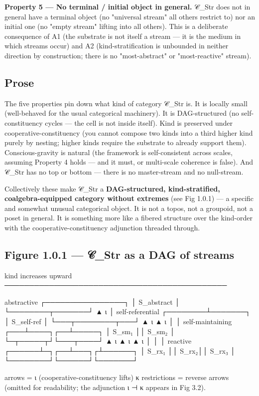 \documentclass[11pt, openany]{book}
\begin{document}
\textbf{Property 5 --- No terminal / initial object in general.} 𝒞\_\allowbreak{}Str does not in general have a terminal object (no "universal stream" all others restrict to) nor an initial one (no "empty stream" lifting into all others). This is a deliberate consequence of A1 (the substrate is not itself a stream --- it is the medium in which streams occur) and A2 (kind-stratification is unbounded in neither direction by construction; there is no "most-abstract" or "most-reactive" stream).

\subsection{Prose}

The five properties pin down what kind of category 𝒞\_\allowbreak{}Str is. It is locally small (well-behaved for the usual categorical machinery). It is DAG-structured (no self-constituency cycles --- the cell is not inside itself). Kind is preserved under cooperative-constituency (you cannot compose two kinds into a third higher kind purely by nesting; higher kinds require the substrate to already support them). Conscious-gravity is natural (the framework is self-consistent across scales, assuming Property 4 holds --- and it must, or multi-scale coherence is false). And 𝒞\_\allowbreak{}Str has no top or bottom --- there is no master-stream and no null-stream.

Collectively these make 𝒞\_\allowbreak{}Str a \textbf{DAG-structured, kind-stratified, coalgebra-equipped category without extremes} (see Fig 1.0.1) --- a specific and somewhat unusual categorical object. It is not a topos, not a groupoid, not a poset in general. It is something more like a fibered structure over the kind-order with the cooperative-constituency adjunction threaded through.

\subsection{Figure 1.0.1 --- 𝒞\_\allowbreak{}Str as a DAG of streams}

\begin{Code}
kind increases upward
─────────────────────────────────────────────

  abstractive     ┌────────────────┐
                  │   S_abstract   │
                  └────────┬───────┘
                           ▲ ι
                           │
  self-referential ┌────────┴───────┐
                   │   S_self-ref   │
                   └───┬────────┬───┘
                       ▲ ι      ▲ ι
                       │        │
  self-maintaining ┌───┴────┐┌──┴─────┐
                   │ S_sm₁  ││ S_sm₂  │
                   └─┬─────┬┘└───┬────┘
                     ▲ ι   ▲ ι   ▲ ι
                     │     │     │
  reactive    ┌──────┴─┐┌──┴───┐┌┴──────┐
              │ S_rx₁  ││ S_rx₂││ S_rx₃ │
              └────────┘└──────┘└───────┘

arrows = ι (cooperative-constituency lifts)
κ restrictions = reverse arrows (omitted for
readability; the adjunction ι ⊣ κ appears in
Fig 3.2).
\end{Code}
\end{document}
